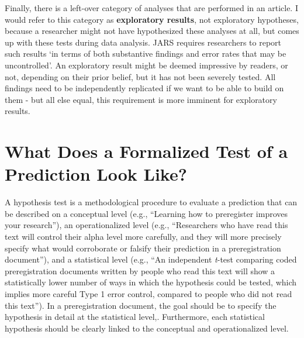 \documentclass[
  oneside]{book}
\begin{document}
Finally, there is a left-over category of analyses that are performed in an article. I would refer to this category as \textbf{exploratory results}, not exploratory hypotheses, because a researcher might not have hypothesized these analyses at all, but comes up with these tests during data analysis. JARS requires researchers to report such results `in terms of both substantive findings and error rates that may be uncontrolled'. An exploratory result might be deemed impressive by readers, or not, depending on their prior belief, but it has not been severely tested. All findings need to be independently replicated if we want to be able to build on them - but all else equal, this requirement is more imminent for exploratory results.

\hypertarget{what-does-a-formalized-test-of-a-prediction-look-like}{%
\section{What Does a Formalized Test of a Prediction Look Like?}\label{what-does-a-formalized-test-of-a-prediction-look-like}}

A hypothesis test is a methodological procedure to evaluate a prediction that can be described on a conceptual level (e.g., ``Learning how to preregister improves your research''), an operationalized level (e.g., ``Researchers who have read this text will control their alpha level more carefully, and they will more precisely specify what would corroborate or falsify their prediction in a preregistration document''), and a statistical level (e.g., ``An independent \emph{t}-test comparing coded preregistration documents written by people who read this text will show a statistically lower number of ways in which the hypothesis could be tested, which implies more careful Type 1 error control, compared to people who did not read this text''). In a preregistration document, the goal should be to specify the hypothesis in detail at the statistical level,. Furthermore, each statistical hypothesis should be clearly linked to the conceptual and operationalized level.
\end{document}
